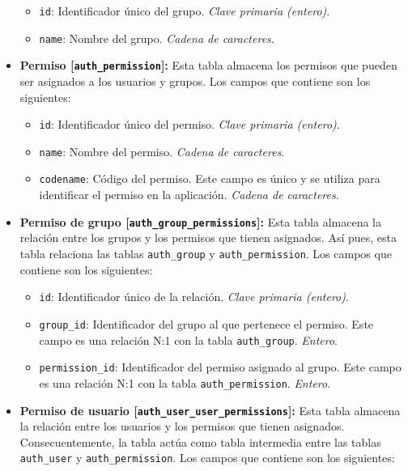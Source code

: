 \begin{itemize}
\begin{itemize}
              \item \texttt{id}: Identificador único del grupo. \textit{Clave primaria (entero)}.
              \item \texttt{name}: Nombre del grupo. \textit{Cadena de caracteres}.
          \end{itemize}
    \item \textbf{Permiso [\texttt{auth\_permission}]:} Esta tabla almacena los permisos que pueden ser asignados a los usuarios y grupos. Los campos que contiene son los siguientes:
          \begin{itemize}
              \item \texttt{id}: Identificador único del permiso. \textit{Clave primaria (entero)}.
              \item \texttt{name}: Nombre del permiso. \textit{Cadena de caracteres}.
              \item \texttt{codename}: Código del permiso. Este campo es único y se utiliza para identificar el permiso en la aplicación. \textit{Cadena de caracteres}.
          \end{itemize}
    \item \textbf{Permiso de grupo [\texttt{auth\_group\_permissions}]:} Esta tabla almacena la relación entre los grupos y los permisos que tienen asignados. Así pues, esta tabla relaciona las tablas \texttt{auth\_group} y \texttt{auth\_permission}. Los campos que contiene son los siguientes:
          \begin{itemize}
              \item \texttt{id}: Identificador único de la relación. \textit{Clave primaria (entero)}.
              \item \texttt{group\_id}: Identificador del grupo al que pertenece el permiso. Este campo es una relación N:1 con la tabla \texttt{auth\_group}. \textit{Entero}.
              \item \texttt{permission\_id}: Identificador del permiso asignado al grupo. Este campo es una relación N:1 con la tabla \texttt{auth\_permission}. \textit{Entero}.
          \end{itemize}
    \item \textbf{Permiso de usuario [\texttt{auth\_user\_user\_permissions}]:} Esta tabla almacena la relación entre los usuarios y los permisos que tienen asignados. Consecuentemente, la tabla actúa como tabla intermedia entre las tablas \texttt{auth\_user} y \texttt{auth\_permission}. Los campos que contiene son los siguientes:
          \begin{itemize}

\end{itemize}
\end{itemize}
